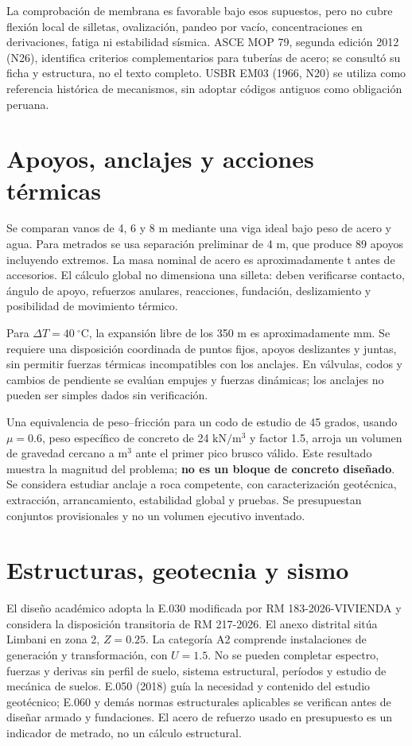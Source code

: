 La comprobación de membrana es favorable bajo esos supuestos, pero no cubre flexión local de silletas, ovalización, pandeo por vacío, concentraciones en derivaciones, fatiga ni estabilidad sísmica. ASCE MOP 79, segunda edición 2012 (N26), identifica criterios complementarios para tuberías de acero; se consultó su ficha y estructura, no el texto completo. USBR EM03 (1966, N20) se utiliza como referencia histórica de mecanismos, sin adoptar códigos antiguos como obligación peruana.

\section{Apoyos, anclajes y acciones térmicas}
Se comparan vanos de 4, 6 y 8 m mediante una viga ideal bajo peso de acero y agua. Para metrados se usa separación preliminar de 4 m, que produce 89 apoyos incluyendo extremos. La masa nominal de acero es aproximadamente  t antes de accesorios. El cálculo global no dimensiona una silleta: deben verificarse contacto, ángulo de apoyo, refuerzos anulares, reacciones, fundación, deslizamiento y posibilidad de movimiento térmico.


Para \(\Delta T=40\ ^\circ\mathrm{C}\), la expansión libre de los 350 m es aproximadamente  mm. Se requiere una disposición coordinada de puntos fijos, apoyos deslizantes y juntas, sin permitir fuerzas térmicas incompatibles con los anclajes. En válvulas, codos y cambios de pendiente se evalúan empujes y fuerzas dinámicas; los anclajes no pueden ser simples dados sin verificación.

Una equivalencia de peso--fricción para un codo de estudio de 45 grados, usando \(\mu=0.6\), peso específico de concreto de 24 \(\mathrm{kN/m^3}\) y factor 1.5, arroja un volumen de gravedad cercano a  \(\mathrm{m^3}\) ante el primer pico brusco válido. Este resultado muestra la magnitud del problema; \textbf{no es un bloque de concreto diseñado}. Se considera estudiar anclaje a roca competente, con caracterización geotécnica, extracción, arrancamiento, estabilidad global y pruebas. Se presupuestan conjuntos provisionales y no un volumen ejecutivo inventado.

\section{Estructuras, geotecnia y sismo}
El diseño académico adopta la E.030 modificada por RM 183-2026-VIVIENDA y considera la disposición transitoria de RM 217-2026. El anexo distrital sitúa Limbani en zona 2, \(Z=0.25\). La categoría A2 comprende instalaciones de generación y transformación, con \(U=1.5\). No se pueden completar espectro, fuerzas y derivas sin perfil de suelo, sistema estructural, períodos y estudio de mecánica de suelos. E.050 (2018) guía la necesidad y contenido del estudio geotécnico; E.060 y demás normas estructurales aplicables se verifican antes de diseñar armado y fundaciones. El acero de refuerzo usado en presupuesto es un indicador de metrado, no un cálculo estructural.

